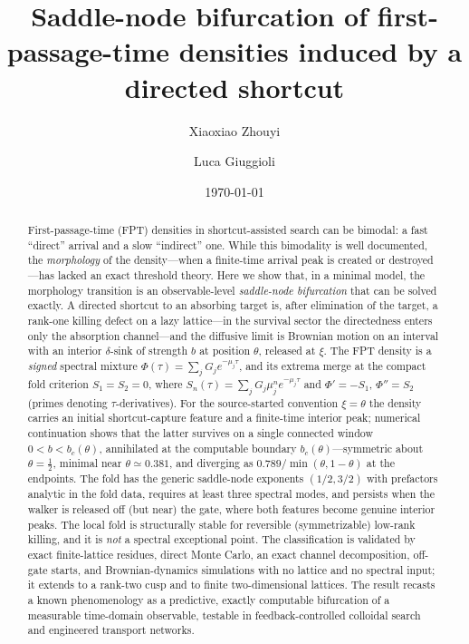 \documentclass[reprint,amsmath,amssymb,aps,prresearch,longbibliography]{revtex4-2}
\begin{document}
\title{Saddle-node bifurcation of first-passage-time densities induced by a directed shortcut}

\author{Xiaoxiao Zhouyi}
\author{Luca Giuggioli}

\date{\today}

\begin{abstract}
First-passage-time (FPT) densities in shortcut-assisted search can be bimodal: a fast ``direct''
arrival and a slow ``indirect'' one. While this bimodality is well documented, the
\emph{morphology} of the density---when a finite-time arrival peak is created or destroyed---has
lacked an exact threshold theory. Here we show that, in a minimal model, the morphology transition
is an observable-level \emph{saddle-node bifurcation} that can be solved exactly. A directed
shortcut to an absorbing target is, after elimination of the target, a rank-one killing defect on a
lazy lattice---in the survival sector the directedness enters only the absorption channel---and the
diffusive limit is Brownian motion on an interval with an interior $\delta$-sink of strength $b$ at
position $\theta$, released at $\xi$. The FPT density is a \emph{signed} spectral mixture
$\Phi(\tau)=\sum_j G_j e^{-\mu_j\tau}$, and its extrema merge at the compact fold criterion
$S_1=S_2=0$, where $S_n(\tau)=\sum_j G_j\mu_j^{n}e^{-\mu_j\tau}$ and $\Phi'=-S_1$, $\Phi''=S_2$
(primes denoting $\tau$-derivatives). For the source-started convention $\xi=\theta$ the density
carries an initial shortcut-capture feature and a finite-time interior peak; numerical continuation
shows that the latter survives on a single connected window $0<b<b_c(\theta)$, annihilated at the
computable boundary $b_c(\theta)$---symmetric about $\theta=\tfrac12$, minimal near
$\theta\simeq0.381$, and diverging as $0.789/\min(\theta,1-\theta)$ at the
endpoints. The fold has the generic saddle-node exponents
$(1/2,3/2)$ with prefactors analytic in the fold data, requires at least three spectral modes, and
persists when the walker is released off (but near) the gate, where both features become genuine
interior peaks. The local fold is structurally stable for reversible (symmetrizable) low-rank
killing, and it is \emph{not} a spectral exceptional point. The classification is validated by exact
finite-lattice residues, direct Monte Carlo, an exact channel decomposition, off-gate starts, and
Brownian-dynamics
simulations with no lattice and no spectral input; it extends to a rank-two cusp and to finite
two-dimensional lattices. The result recasts a known phenomenology as a predictive, exactly
computable bifurcation of a measurable time-domain observable, testable in feedback-controlled
colloidal search and engineered transport networks.
\end{abstract}
\end{document}
